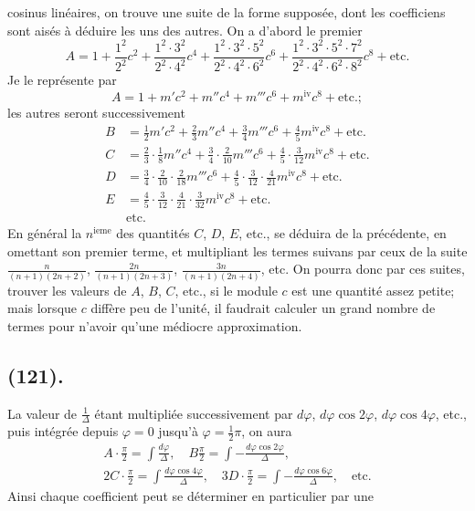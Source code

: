 \documentclass{article}
\begin{document}
cosinus linéaires, on trouve une suite de la forme supposée, dont les coefficiens sont aisés à déduire les uns des autres. On a d'abord le premier
\[ A=1+\frac{1^{2}}{2^{2}}c^{2}+\frac{1^{2}\cdot3^{2}}{2^{2}\cdot4^{2}}c^{4}+\frac{1^{2}\cdot3^{2}\cdot5^{2}}{2^{2}\cdot4^{2}\cdot6^{2}}c^{6}+\frac{1^{2}\cdot3^{2}\cdot5^{2}\cdot7^{2}}{2^{2}\cdot4^{2}\cdot6^{2}\cdot8^{2}}c^{8}+\text{etc.} \]
Je le représente par
\[ A=1+m'c^{2}+m''c^{4}+m'''c^{6}+m^{\text{iv}}c^{8}+\text{etc.}; \]
les autres seront successivement
\[ \begin{aligned} B&=\tfrac{1}{2}m'c^{2}+\tfrac{2}{3}m''c^{4}+\tfrac{3}{4}m'''c^{6}+\tfrac{4}{5}m^{\text{iv}}c^{8}+\text{etc.}\\ C&=\tfrac{2}{3}\cdot\tfrac{1}{8}m''c^{4}+\tfrac{3}{4}\cdot\tfrac{2}{10}m'''c^{6}+\tfrac{4}{5}\cdot\tfrac{3}{12}m^{\text{iv}}c^{8}+\text{etc.}\\ D&=\tfrac{3}{4}\cdot\tfrac{2}{10}\cdot\tfrac{2}{18}m'''c^{6}+\tfrac{4}{5}\cdot\tfrac{3}{12}\cdot\tfrac{4}{21}m^{\text{iv}}c^{8}+\text{etc.}\\ E&=\tfrac{4}{5}\cdot\tfrac{3}{12}\cdot\tfrac{4}{21}\cdot\tfrac{3}{32}m^{\text{iv}}c^{8}+\text{etc.}\\ &\text{etc.} \end{aligned} \]
En général la $n^{\text{ieme}}$ des quantités $C$, $D$, $E$, etc., se déduira de la précédente, en omettant son premier terme, et multipliant les termes suivans par ceux de la suite $\frac{n}{(n+1)(2n+2)}$, $\frac{2n}{(n+1)(2n+3)}$, $\frac{3n}{(n+1)(2n+4)}$, etc. On pourra donc par ces suites, trouver les valeurs de $A$, $B$, $C$, etc., si le module $c$ est une quantité assez petite; mais lorsque $c$ diffère peu de l'unité, il faudrait calculer un grand nombre de termes pour n'avoir qu'une médiocre approximation.

\subsection*{(121).}

La valeur de $\frac{1}{\Delta}$ étant multipliée successivement par $d\varphi$, $d\varphi\cos2\varphi$, $d\varphi\cos4\varphi$, etc., puis intégrée depuis $\varphi=0$ jusqu'à $\varphi=\frac{1}{2}\pi$, on aura
\[ \begin{gathered} A\cdot\frac{\pi}{2}=\int\frac{d\varphi}{\Delta},\quad B\frac{\pi}{2}=\int-\frac{d\varphi\cos2\varphi}{\Delta},\\ 2C\cdot\frac{\pi}{2}=\int\frac{d\varphi\cos4\varphi}{\Delta},\quad 3D\cdot\frac{\pi}{2}=\int-\frac{d\varphi\cos6\varphi}{\Delta},\quad\text{etc.} \end{gathered} \]
Ainsi chaque coefficient peut se déterminer en particulier par une
\end{document}
